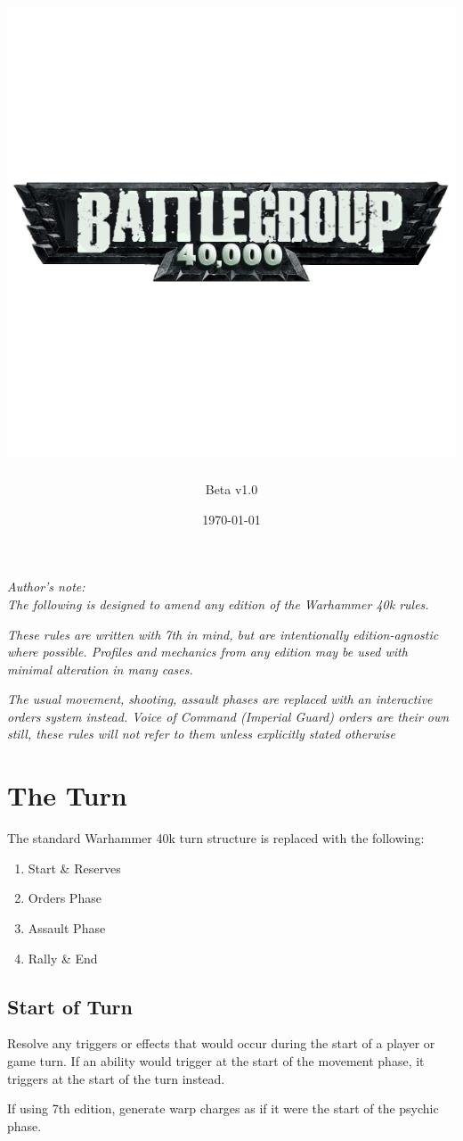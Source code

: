 \documentclass[letterpaper,twocolumn,oneside,titlepage]{book}
\title{
    \includegraphics[width=\textwidth]{img/style/bg40klogo.png}\\
}
\author{Beta v1.0}
\date{\today}
\providecommand{\tightlist}{%
  \setlength{\itemsep}{0pt}\setlength{\parskip}{0pt}}
\begin{document}
\frontmatter
\maketitle

{
\setcounter{tocdepth}{2}
\tableofcontents
\cleardoublepage
}
\mainmatter
\emph{Author's note:}\\
\emph{The following is designed to amend any edition of the Warhammer
40k rules.}

\emph{These rules are written with 7th in mind, but are intentionally
edition-agnostic where possible. Profiles and mechanics from any edition
may be used with minimal alteration in many cases.}

\emph{The usual movement, shooting, assault phases are replaced with an
interactive orders system instead. Voice of Command (Imperial Guard)
orders are their own still, these rules will not refer to them unless
explicitly stated otherwise}

\chapter{\texorpdfstring{\textbf{The Turn}}{The Turn}}\label{the-turn}

The standard Warhammer 40k turn structure is replaced with the
following:

\begin{enumerate}
\def\labelenumi{\arabic{enumi}.}
\tightlist
\item
  Start \& Reserves\\
\item
  Orders Phase\\
\item
  Assault Phase\\
\item
  Rally \& End
\end{enumerate}

\section{\texorpdfstring{\textbf{Start of
Turn}}{Start of Turn}}\label{start-of-turn}

Resolve any triggers or effects that would occur during the start of a
player or game turn. If an ability would trigger at the start of the
movement phase, it triggers at the start of the turn instead.

If using 7th edition, generate warp charges as if it were the start of
the psychic phase.
\end{document}
